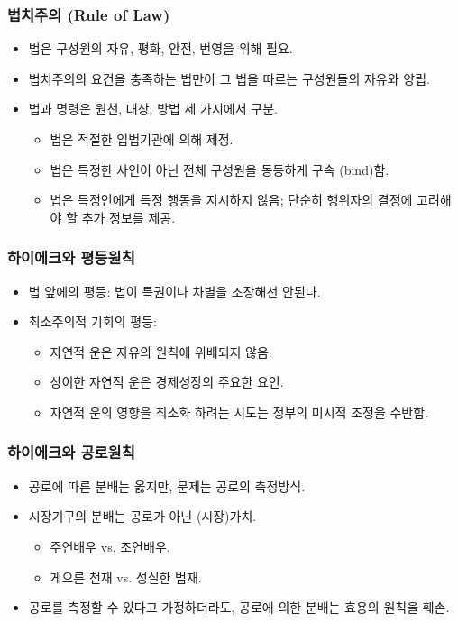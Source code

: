 \documentclass[aspectratio=169,xcolor=dvipsnames,handout]{beamer}
\begin{document}
\begin{frame}[<+->]
\frametitle{법치주의 (Rule of Law)}
    \begin{itemize}
        \item 법은 구성원의 자유, 평화, 안전, 번영을 위해 필요.
        \item 법치주의의 요건을 충족하는 법만이 그 법을 따르는 구성원들의 자유와 양립.
        \item 법과 명령은 원천, 대상, 방법 세 가지에서 구분.
        \begin{itemize}
            \item 법은 적절한 입법기관에 의해 제정.
            \item 법은 특정한 사인이 아닌 전체 구성원을 동등하게 구속 (bind)함.
            \item 법은 특정인에게 특정 행동을 지시하지 않음; 단순히 행위자의 결정에 고려해야 할 추가 정보를 제공.
        \end{itemize}
    \end{itemize}
\end{frame}

\begin{frame}[<+->]
\frametitle{하이에크와 평등원칙}
    \begin{itemize}
        \item 법 앞에의 평등: 법이 특권이나 차별을 조장해선 안된다. 
        \item 최소주의적 기회의 평등:
        \begin{itemize}
            \item  자연적 운은 자유의 원칙에 위배되지 않음.
            \item  상이한 자연적 운은 경제성장의 주요한 요인.
            \item  자연적 운의 영향을 최소화 하려는 시도는 정부의 미시적 조정을 수반함.
        \end{itemize}
    \end{itemize}
\end{frame}

\begin{frame}[<+->]
\frametitle{하이에크와 공로원칙}
    \begin{itemize}
        \item 공로에 따른 분배는 옳지만, 문제는 공로의 측정방식. 
        \item 시장기구의 분배는 공로가 아닌 (시장)가치.
        \begin{itemize}
            \item 주연배우 vs. 조연배우. 
            \item 게으른 천재 vs. 성실한 범재.
        \end{itemize}
        \item  공로를 측정할 수 있다고 가정하더라도, 공로에 의한 분배는 효용의 원칙을 훼손.
    \end{itemize}
\end{frame}
\end{document}
